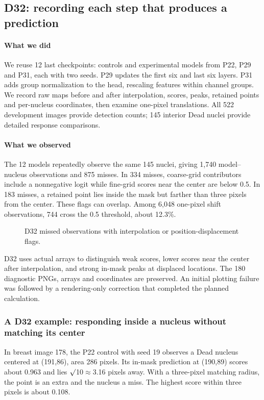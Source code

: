 \documentclass[
  12pt,
]{article}
\begin{document}
\subsection{D32: recording each step that produces a prediction}\label{chapter7}
\paragraph{What we did}
We reuse 12 last checkpoints: controls and experimental models from P22, P29 and P31, each with two seeds. P29 updates the first six and last six layers. P31 adds group normalization to the head, rescaling features within channel groups. We record raw maps before and after interpolation, scores, peaks, retained points and per-nucleus coordinates, then examine one-pixel translations. All 522 development images provide detection counts; 145 interior Dead nuclei provide detailed response comparisons.

\paragraph{What we observed}
The 12 models repeatedly observe the same 145 nuclei, giving 1,740 model–nucleus observations and 875 misses. In 334 misses, coarse-grid contributors include a nonnegative logit while fine-grid scores near the center are below 0.5. In 183 misses, a retained point lies inside the mask but farther than three pixels from the center. These flags can overlap. Among 6,048 one-pixel shift observations, 744 cross the 0.5 threshold, about 12.3\%.

\begin{figure}[H]\centering\caption{D32 missed observations with interpolation or position-displacement flags.}\end{figure}
D32 uses actual arrays to distinguish weak scores, lower scores near the center after interpolation, and strong in-mask peaks at displaced locations. The 180 diagnostic PNGs, arrays and coordinates are preserved. An initial plotting failure was followed by a rendering-only correction that completed the planned calculation.

\subsubsection{A D32 example: responding inside a nucleus without matching its center}\label{chapter8}
In breast image 178, the P22 control with seed 19 observes a Dead nucleus centered at (191,86), area 286 pixels. Its in-mask prediction at (190,89) scores about 0.963 and lies \ensuremath{\surd}10\ensuremath{\approx}3.16 pixels away. With a three-pixel matching radius, the point is an extra and the nucleus a miss. The highest score within three pixels is about 0.108.
\end{document}
